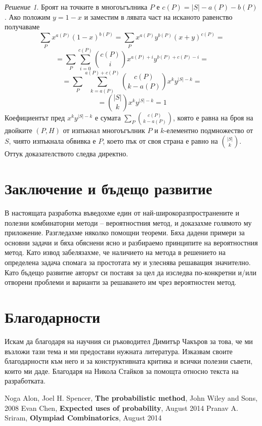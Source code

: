 \documentclass[11 pt, a4paper]{article}
\theoremstyle{definition}
\theoremstyle{remark}
\newtheorem*{s}{Решение}
\begin{document}
\begin{s}
Броят на точките в многоъгълника $P$ е $c(P)=|S|-a(P)-b(P)$. Ако положим $y=1-x$ и заместим в лявата част на исканото равенство получаваме
\begin{equation*}
\sum_{P}x^{a(P)}(1-x)^{b(P)}=\sum_{P}x^{a(P)}y^{b(P)}(x+y)^{c(P)}=
\end{equation*}
\begin{equation*}
=\sum_{P}\sum_{i=0}^{c(P)}{{c(P)}\choose{i}}x^{a(P)+i}y^{b(P)+c(P)-i}=
\end{equation*}
\begin{equation*}
=\sum_{P}\sum_{k=a(P)}^{a(P)+c(P)}{{c(P)}\choose{k-a(P)}}x^{k}y^{|S|-k}=
\end{equation*}
\begin{equation*}
={{|S|}\choose{k}}x^{k}y^{|S|-k}=1
\end{equation*}
Коефициентът пред $x^{k}y^{|S|-k}$ е сумата $\sum_{P}{{c(P)}\choose{k-a(P)}}$, която е равна на броя на двойките $(P,H)$ от изпъкнал многоъгълник $P$ и $k$-елементно подмножество от $S$, чиято изпъкнала обвивка е $P$, което пък от своя страна е равно на ${{|S|}\choose{k}}$. Оттук доказателството следва директно. 
\end{s}
\section{Заключение и бъдещо развитие}
В настоящата разработка въведохме един от най-широкоразпространените и полезни комбинаторни методи -- вероятностния метод, и доказахме голямото му приложение. Разгледахме няколко помощни теореми. Бяха дадени примери за основни задачи и бяха обяснени ясно и разбираемо принципите на вероятностния метод. Като извод забелязахме, че наличието на метода в решението на определена задача спомага за простотата му и улеснява решаващия значително.    \\
Като бъдещо развитие авторът си поставя за цел да изследва по-конкретни и/или отворени проблеми и варианти за решаването им чрез вероятностен метод.

\section{Благодарности}

Искам да благодаря на научния си ръководител Димитър Чакъров за това, че ми възложи тази тема и ми предостави нужната литература. Изказвам своите благодарности към него и за конструктивната критика и всички полезни съвети, които ми даде. Благодаря на Никола Стайков за помощта относно текста на разработката.

\begin{thebibliography}{}
Noga Alon, Joel H. Spencer, \textbf {The probabilistic method}, John Wiley and Sons, 2008
Evan Chen, \textbf{Expected uses of probability}, August 2014
Pranav A. Sriram, \textbf{Olympiad Combinatorics}, August 2014
\end{thebibliography}
\end{document}
